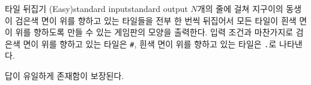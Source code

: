 \begin{problem}{타일 뒤집기 (Easy)}{standard input}{standard output}
\OutputFile
$N$개의 줄에 걸쳐 지구이의 동생이 검은색 면이 위를 향하고 있는 타일들을 전부 한 번씩 뒤집어서 모든 타일이 흰색 면이 위를 향하도록 만들 수 있는 게임판의 모양을 출력한다. 입력 조건과 마찬가지로 검은색 면이 위를 향하고 있는 타일은 \texttt{\#}, 흰색 면이 위를 향하고 있는 타일은 \texttt{.}로 나타낸다.

답이 유일하게 존재함이 보장된다.

\Example

\begin{example}
%
%
%
\end{example}

\end{problem}
